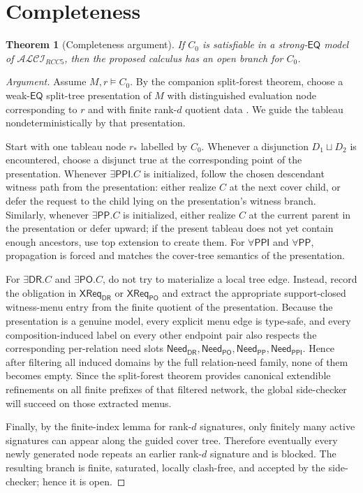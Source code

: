 \documentclass[11pt]{article}
\newtheorem{theorem}[definition]{Theorem}
\theoremstyle{remark}
\newcommand{\DR}{\mathsf{DR}}
\newcommand{\PO}{\mathsf{PO}}
\newcommand{\PP}{\mathsf{PP}}
\newcommand{\PPI}{\mathsf{PPI}}
\newcommand{\EQ}{\mathsf{EQ}}
\newcommand{\CrossDR}{\mathsf{XReq}_{\DR}}
\newcommand{\CrossPO}{\mathsf{XReq}_{\PO}}
\newcommand{\NeedDR}{\mathsf{Need}_{\DR}}
\newcommand{\NeedPO}{\mathsf{Need}_{\PO}}
\newcommand{\NeedPP}{\mathsf{Need}_{\PP}}
\newcommand{\NeedPPI}{\mathsf{Need}_{\PPI}}
\begin{document}
\section{Completeness}

\begin{theorem}[Completeness argument]\label{thm:completeness}
If $C_0$ is satisfiable in a strong-$\EQ$ model of $\mathcal{ALCI}_{RCC5}$, then the proposed calculus has an open branch for $C_0$.
\end{theorem}

\begin{proof}[Argument]
Assume $M,r\models C_0$. By the companion split-forest theorem, choose a weak-$\EQ$ split-tree presentation of $M$ with distinguished evaluation node corresponding to $r$ and with finite rank-$d$ quotient data \cite{SiblingCompleted}. We guide the tableau nondeterministically by that presentation.

Start with one tableau node $r_\ast$ labelled by $C_0$. Whenever a disjunction $D_1\sqcup D_2$ is encountered, choose a disjunct true at the corresponding point of the presentation. Whenever $\exists\PPI.C$ is initialized, follow the chosen descendant witness path from the presentation: either realize $C$ at the next cover child, or defer the request to the child lying on the presentation's witness branch. Similarly, whenever $\exists\PP.C$ is initialized, either realize $C$ at the current parent in the presentation or defer upward; if the present tableau does not yet contain enough ancestors, use top extension to create them. For $\forall\PPI$ and $\forall\PP$, propagation is forced and matches the cover-tree semantics of the presentation.

For $\exists\DR.C$ and $\exists\PO.C$, do not try to materialize a local tree edge. Instead, record the obligation in $\CrossDR$ or $\CrossPO$ and extract the appropriate support-closed witness-menu entry from the finite quotient of the presentation. Because the presentation is a genuine model, every explicit menu edge is type-safe, and every composition-induced label on every other endpoint pair also respects the corresponding per-relation need slots $\NeedDR,\NeedPO,\NeedPP,\NeedPPI$. Hence after filtering all induced domains by the full relation-need family, none of them becomes empty. Since the split-forest theorem provides canonical extendible refinements on all finite prefixes of that filtered network, the global side-checker will succeed on those extracted menus.

Finally, by the finite-index lemma for rank-$d$ signatures, only finitely many active signatures can appear along the guided cover tree. Therefore eventually every newly generated node repeats an earlier rank-$d$ signature and is blocked. The resulting branch is finite, saturated, locally clash-free, and accepted by the side-checker; hence it is open.
\end{proof}
\end{document}
